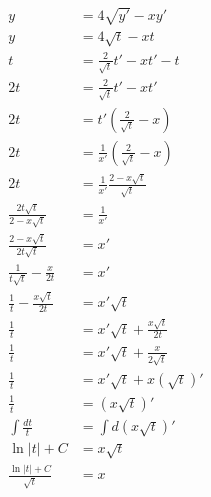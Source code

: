 \begin{align*}
    y                                  & = 4\sqrt{y'} - xy'                                        \\
    y                                  & = 4\sqrt{t} - xt                                          \\
    t                                  & = \frac{2}{\sqrt{t}}{t'} - xt' - t                        \\
    2t                                 & = \frac{2}{\sqrt{t}}{t'} - xt'                            \\
    2t                                 & = t'\left(\frac{2}{\sqrt{t}} - x\right)                   \\
    2t                                 & = \frac{1}{x'}\left(\frac{2}{\sqrt{t}} - x\right) \tag{1} \\
    2t                                 & = \frac{1}{x'}\frac{2 -x\sqrt{t}}{\sqrt{t}}               \\
    \frac{2t\sqrt t}{2 -x\sqrt{t}}     & = \frac{1}{x'}                                            \\
    \frac{2 -x\sqrt{t}}{2t\sqrt t}     & = x'                                                      \\
    \frac{1}{t\sqrt t} - \frac{x}{2t}  & = x'                                                      \\
    \frac{1}{t} - \frac{x\sqrt{t}}{2t} & = x'\sqrt{t}                                              \\
    \frac{1}{t}                        & = x'\sqrt{t} + \frac{x\sqrt{t}}{2t}                       \\
    \frac{1}{t}                        & = x'\sqrt{t} + \frac{x}{2\sqrt{t}}                        \\
    \frac{1}{t}                        & = x'\sqrt{t} + x(\sqrt{t})'                               \\
    \frac{1}{t}                        & = (x\sqrt{t})'                                            \\
    \int \frac{dt}{t}                  & = \int d(x\sqrt{t})'                                      \\
    \ln |t| + C                        & = x\sqrt{t}                                               \\
    \frac{\ln |t| + C}{\sqrt{t}}       & = x                                                       \\
\end{align*}

